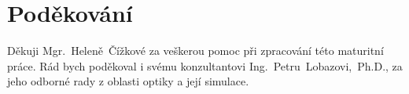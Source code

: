\vspace*{\fill}

\chapter*{Poděkování}

\begin{sloppypar}
Děkuji \mbox{Mgr. Heleně Čížkové} za veškerou pomoc při zpracování této maturitní práce. Rád bych poděkoval i svému konzultantovi \mbox{Ing. Petru Lobazovi, Ph.D.,} za jeho odborné rady z oblasti optiky a její simulace.
\end{sloppypar}

\vspace*{1cm}
